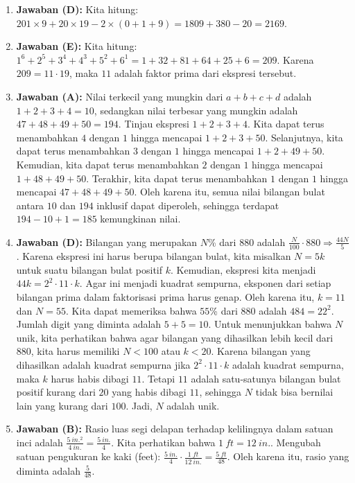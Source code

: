 \documentclass[12pt]{scrartcl}
\begin{document}
\begin{enumerate}
\item \textbf{Jawaban (D):} Kita hitung: $201\times9+20\times19-2\times(0+1+9)=1809+380-20=2169$.

\item \textbf{Jawaban (E):} Kita hitung: $1^{6}+2^{5}+3^{4}+4^{3}+5^{2}+6^{1}=1+32+81+64+25+6=209$. Karena $209=11\cdot19$, maka $11$ adalah faktor prima dari ekspresi tersebut.

\item \textbf{Jawaban (A):} Nilai terkecil yang mungkin dari $a+b+c+d$ adalah $1+2+3+4=10$, sedangkan nilai terbesar yang mungkin adalah $47+48+49+50=194$. Tinjau ekspresi $1+2+3+4$. Kita dapat terus menambahkan $4$ dengan $1$ hingga mencapai $1+2+3+50$. Selanjutnya, kita dapat terus menambahkan $3$ dengan $1$ hingga mencapai $1+2+49+50$. Kemudian, kita dapat terus menambahkan $2$ dengan $1$ hingga mencapai $1+48+49+50$. Terakhir, kita dapat terus menambahkan $1$ dengan $1$ hingga mencapai $47+48+49+50$. Oleh karena itu, semua nilai bilangan bulat antara $10$ dan $194$ inklusif dapat diperoleh, sehingga terdapat $194-10+1=185$ kemungkinan nilai.

\item \textbf{Jawaban (D):} Bilangan yang merupakan $N$\% dari $880$ adalah $\frac{N}{100}\cdot880\Rightarrow\frac{44N}{5}$. Karena ekspresi ini harus berupa bilangan bulat, kita misalkan $N=5k$ untuk suatu bilangan bulat positif $k$. Kemudian, ekspresi kita menjadi $44k=2^{2}\cdot11\cdot k$. Agar ini menjadi kuadrat sempurna, eksponen dari setiap bilangan prima dalam faktorisasi prima harus genap. Oleh karena itu, $k=11$ dan $N=55$. Kita dapat memeriksa bahwa $55$\% dari $880$ adalah $484=22^{2}$. Jumlah digit yang diminta adalah $5+5=10$. Untuk menunjukkan bahwa $N$ unik, kita perhatikan bahwa agar bilangan yang dihasilkan lebih kecil dari $880$, kita harus memiliki $N<100$ atau $k<20$. Karena bilangan yang dihasilkan adalah kuadrat sempurna jika $2^{2}\cdot11\cdot k$ adalah kuadrat sempurna, maka $k$ harus habis dibagi $11$. Tetapi $11$ adalah satu-satunya bilangan bulat positif kurang dari $20$ yang habis dibagi $11$, sehingga $N$ tidak bisa bernilai lain yang kurang dari $100$. Jadi, $N$ adalah unik.

\item \textbf{Jawaban (B):} Rasio luas segi delapan terhadap kelilingnya dalam satuan inci adalah $\frac{5~in.^{2}}{4~in.}=\frac{5~in.}{4}$. Kita perhatikan bahwa $1~ft=12~in.$. Mengubah satuan pengukuran ke kaki (feet): $\frac{5~in.}{4}\cdot\frac{1~ft}{12~in.}=\frac{5~ft}{48}$. Oleh karena itu, rasio yang diminta adalah $\frac{5}{48}$.


\end{enumerate}
\end{document}
